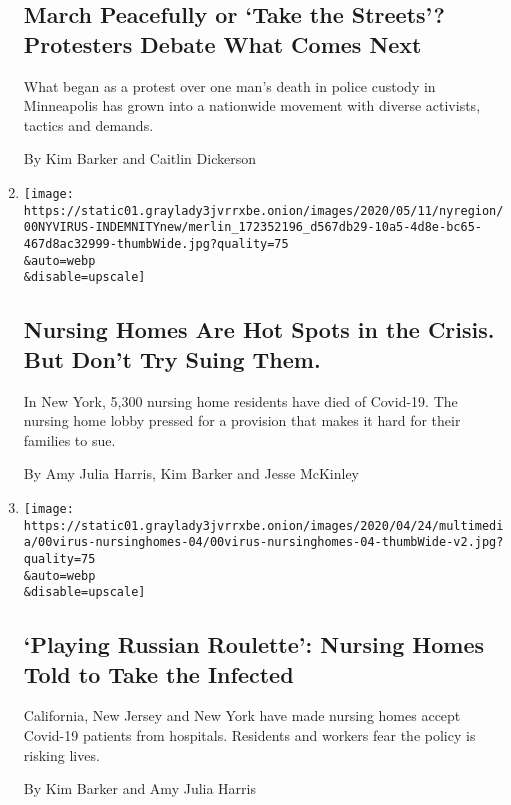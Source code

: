 \begin{enumerate}
  \hypertarget{march-peacefully-or-take-the-streets-protesters-debate-what-comes-next}{%
  \subsection{March Peacefully or `Take the Streets'? Protesters Debate
  What Comes
  Next}\label{march-peacefully-or-take-the-streets-protesters-debate-what-comes-next}}

  What began as a protest over one man's death in police custody in
  Minneapolis has grown into a nationwide movement with diverse
  activists, tactics and demands.

  By Kim Barker and Caitlin Dickerson
\item
  \href{/2020/05/13/nyregion/nursing-homes-coronavirus-new-york.html}{}

  \texttt{[image: https://static01.graylady3jvrrxbe.onion/images/2020/05/11/nyregion/00NYVIRUS-INDEMNITYnew/merlin\_172352196\_d567db29-10a5-4d8e-bc65-467d8ac32999-thumbWide.jpg?quality=75\\\&auto=webp\\\&disable=upscale]}

  \hypertarget{nursing-homes-are-hot-spots-in-the-crisis-but-dont-try-suing-them}{%
  \subsection{Nursing Homes Are Hot Spots in the Crisis. But Don't Try
  Suing
  Them.}\label{nursing-homes-are-hot-spots-in-the-crisis-but-dont-try-suing-them}}

  In New York, 5,300 nursing home residents have died of Covid-19. The
  nursing home lobby pressed for a provision that makes it hard for
  their families to sue.

  By Amy Julia Harris, Kim Barker and Jesse McKinley
\item
  \href{/2020/04/24/us/nursing-homes-coronavirus.html}{}

  \texttt{[image: https://static01.graylady3jvrrxbe.onion/images/2020/04/24/multimedia/00virus-nursinghomes-04/00virus-nursinghomes-04-thumbWide-v2.jpg?quality=75\\\&auto=webp\\\&disable=upscale]}

  \hypertarget{playing-russian-roulette-nursing-homes-told-to-take-the-infected}{%
  \subsection{`Playing Russian Roulette': Nursing Homes Told to Take the
  Infected}\label{playing-russian-roulette-nursing-homes-told-to-take-the-infected}}

  California, New Jersey and New York have made nursing homes accept
  Covid-19 patients from hospitals. Residents and workers fear the
  policy is risking lives.

  By Kim Barker and Amy Julia Harris
\end{enumerate}

